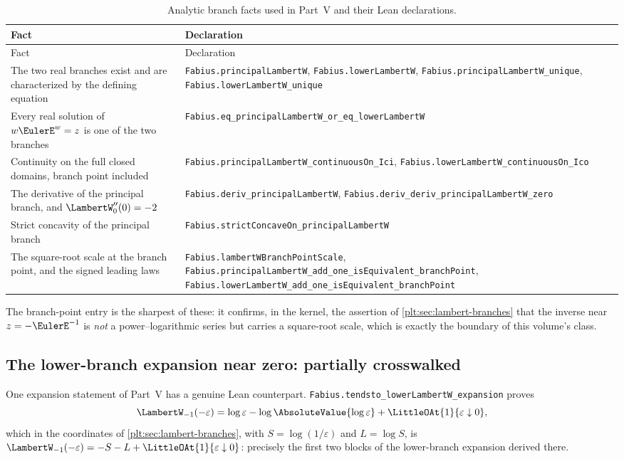 \documentclass[11pt,oneside]{article}
\theoremstyle{plain}
\theoremstyle{definition}
\theoremstyle{remark}
\begin{document}
\begin{longtable}{@{}p{} p{}@{}}
\caption{Analytic branch facts used in Part~V and their Lean declarations.}
\label{plt:tab:lean-branches}\\
\toprule
Fact & Declaration\\
\midrule
\endfirsthead
\toprule
Fact & Declaration\\
\midrule
\endhead
The two real branches exist and are characterized by the defining equation &
  \texttt{Fabius.principalLambertW},
  \texttt{Fabius.lowerLambertW},
  \texttt{Fabius.principalLambertW\_unique},
  \texttt{Fabius.lowerLambertW\_unique}\\
Every real solution of \(w\EulerE^{w}=z\) is one of the two branches &
  \texttt{Fabius.eq\_principalLambertW\_or\_eq\_lowerLambertW}\\
Continuity on the full closed domains, branch point included &
  \texttt{Fabius.principalLambertW\_continuousOn\_Ici},
  \texttt{Fabius.lowerLambertW\_continuousOn\_Ico}\\
The derivative of the principal branch, and \(\LambertW_{0}''(0)=-2\) &
  \texttt{Fabius.deriv\_principalLambertW},
  \texttt{Fabius.deriv\_deriv\_principalLambertW\_zero}\\
Strict concavity of the principal branch &
  \texttt{Fabius.strictConcaveOn\_principalLambertW}\\
The square-root scale at the branch point, and the signed leading laws &
  \texttt{Fabius.lambertWBranchPointScale},
  \texttt{Fabius.principalLambertW\_add\_one\_isEquivalent\_branchPoint},
  \texttt{Fabius.lowerLambertW\_add\_one\_isEquivalent\_branchPoint}\\
\bottomrule
\end{longtable}

The branch-point entry is the sharpest of these: it confirms, in the kernel,
the assertion of \cref{plt:sec:lambert-branches} that the inverse near
\(z=-\EulerE^{-1}\) is \emph{not} a power--logarithmic series but carries a
square-root scale, which is exactly the boundary of this volume's class.

\subsection{The lower-branch expansion near zero: partially crosswalked}

One expansion statement of Part~V has a genuine Lean counterpart.
\texttt{Fabius.tendsto\_lowerLambertW\_expansion} proves
\[
  \LambertW_{-1}(-\varepsilon)
  =\log\varepsilon-\log\AbsoluteValue{\log\varepsilon}+\LittleOAt{1}{\varepsilon\downarrow0},
\]
which in the coordinates of \cref{plt:sec:lambert-branches}, with
\(S=\log(1/\varepsilon)\) and \(L=\log S\), is
\(\LambertW_{-1}(-\varepsilon)=-S-L+\LittleOAt{1}{\varepsilon\downarrow0}\):
precisely the first two blocks of the lower-branch expansion derived there.
\end{document}
